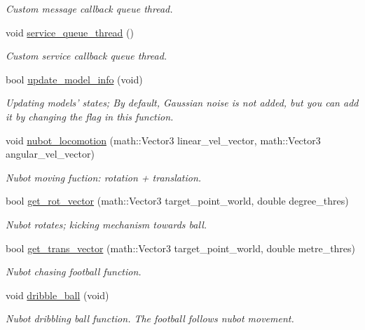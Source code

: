 \begin{DoxyCompactItemize}
\begin{DoxyCompactList}\small\item\em Custom message callback queue thread. \end{DoxyCompactList}\item 
void \hyperlink{classgazebo_1_1NubotGazebo_abe786a1fbc3407f1b2ac655b1af15a8b}{service\-\_\-queue\-\_\-thread} ()
\begin{DoxyCompactList}\small\item\em Custom service callback queue thread. \end{DoxyCompactList}\item 
bool \hyperlink{classgazebo_1_1NubotGazebo_a3b884175db3fd9e7ac88f6076d5f2b8e}{update\-\_\-model\-\_\-info} (void)
\begin{DoxyCompactList}\small\item\em Updating models' states; By default, Gaussian noise is not added, but you can add it by changing the flag in this function. \end{DoxyCompactList}\item 
void \hyperlink{classgazebo_1_1NubotGazebo_ad93752507f23724bba2f731325e4c14b}{nubot\-\_\-locomotion} (math\-::\-Vector3 linear\-\_\-vel\-\_\-vector, math\-::\-Vector3 angular\-\_\-vel\-\_\-vector)
\begin{DoxyCompactList}\small\item\em Nubot moving fuction\-: rotation + translation. \end{DoxyCompactList}\item 
bool \hyperlink{classgazebo_1_1NubotGazebo_a8ac8c9467b8e14b4ceb0718d97031617}{get\-\_\-rot\-\_\-vector} (math\-::\-Vector3 target\-\_\-point\-\_\-world, double degree\-\_\-thres)
\begin{DoxyCompactList}\small\item\em Nubot rotates; kicking mechanism towards ball. \end{DoxyCompactList}\item 
bool \hyperlink{classgazebo_1_1NubotGazebo_a0a50fbb4be79c99cf860b84413f8fa9b}{get\-\_\-trans\-\_\-vector} (math\-::\-Vector3 target\-\_\-point\-\_\-world, double metre\-\_\-thres)
\begin{DoxyCompactList}\small\item\em Nubot chasing football function. \end{DoxyCompactList}\item 
void \hyperlink{classgazebo_1_1NubotGazebo_a91862269320f78bc24856e8877af3cc4}{dribble\-\_\-ball} (void)
\begin{DoxyCompactList}\small\item\em Nubot dribbling ball function. The football follows nubot movement. \end{DoxyCompactList}\item 

\end{DoxyCompactItemize}
